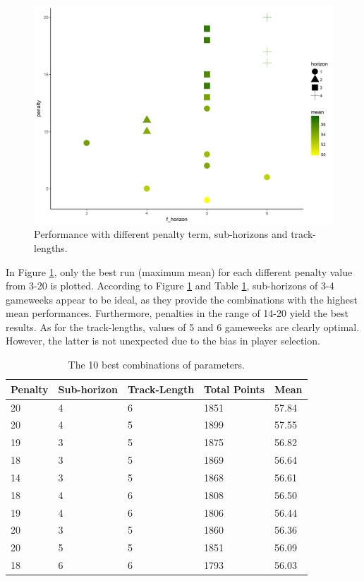 \begin{figure}[H]
    \centering
    \includegraphics[scale=0.45]{fig/chapter_6/paramter_choice.png}
    \caption{Performance with different penalty term, sub-horizons and track-lengths.}
\label{Parameter_choice}    
\end{figure}

In Figure \ref{Parameter_choice}, only the best run (maximum mean) for each different penalty value from 3-20 is plotted. According to Figure \ref{Parameter_choice} and Table \ref{tab:top_10}, sub-horizons of 3-4 gameweeks appear to be ideal, as they provide the combinations with the highest mean performances. Furthermore, penalties in the range of 14-20 yield the best results. As for the track-lengths, values of 5 and 6 gameweeks are clearly optimal. However, the latter is not unexpected due to the bias in player selection. 

\begin{table}[H]
\centering
\begin{tabular}{|l|l|l|l|l|}
\hline
Penalty & Sub-horizon & Track-Length & Total Points & Mean  \\
\hline
20      & 4       & 6                & 1851         & 57.84 \\
20      & 4       & 5                & 1899         & 57.55 \\
19      & 3       & 5                & 1875         & 56.82 \\
18      & 3       & 5                & 1869         & 56.64 \\
14      & 3       & 5                & 1868         & 56.61 \\
18      & 4       & 6                & 1808         & 56.50 \\
19      & 4       & 6                & 1806         & 56.44 \\
20      & 3       & 5                & 1860         & 56.36 \\
20      & 5       & 5                & 1851         & 56.09 \\
18      & 6       & 6                & 1793         & 56.03 \\
\hline
\end{tabular}
\caption{The 10 best combinations of parameters.}
\label{tab:top_10}
\end{table}


